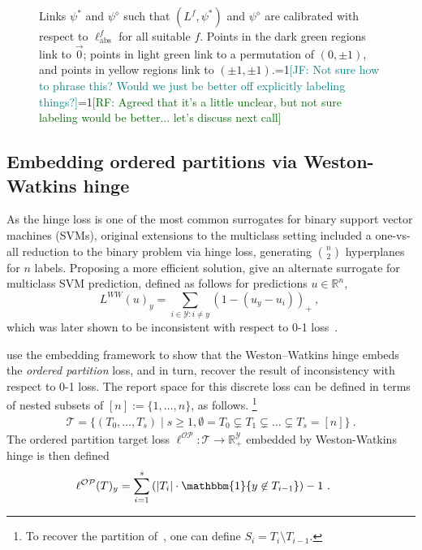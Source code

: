 \documentclass[11pt]{article}
\newcommand{\Comments}{1}
\newcommand{\mynote}[2]{\ifnum\Comments=1\textcolor{#1}{#2}\fi}
\newcommand{\raf}[1]{\mynote{darkgreen}{[RF: #1]}}
\newcommand{\jessie}[1]{\mynote{teal}{[JF: #1]}}
\newcommand{\reals}{\mathbb{R}}
\newcommand{\OP}{\mathcal{OP}}
\newcommand{\T}{\mathcal{T}}
\newcommand{\Y}{\mathcal{Y}}
\newcommand{\ones}{\mathbbm{1}}
\newcommand{\Ind}[1]{\ones\{#1\}}
\newcommand{\ellabs}{\ell_{\text{abs}}^f}
\begin{document}
\begin{figure}
\begin{center}
\begin{minipage}{0.48\linewidth}
		\end{minipage}\hfill
		\caption{Links $\psi^*$ and $\psi^\diamond$ such that $(L^f, \psi^*)$ and $\psi^\diamond$ are calibrated with respect to $\ellabs$ for all suitable $f$. Points in the dark green regions link to $\vec 0$; points in light green link to a permutation of $(0,\pm 1)$, and points in yellow regions link to $(\pm 1, \pm 1)$.\jessie{Not sure how to phrase this?  Would we just be better off explicitly labeling things?}\raf{Agreed that it's a little unclear, but not sure labeling would be better... let's discuss next call}}
		\label{fig:lovasz-links}
	\end{center}
\end{figure}

\subsection{Embedding ordered partitions via Weston-Watkins hinge}
\label{sec:winge}
As the hinge loss is one of the most common surrogates for binary support vector machines (SVMs), original extensions to the multiclass setting included a one-vs-all reduction to the binary problem via hinge loss, generating ${n \choose 2}$ hyperplanes for $n$ labels.
Proposing a more efficient solution, \citet{weston1999support} give an alternate surrogate for multiclass SVM prediction, defined as follows for predictions $u \in \reals^n$,
\begin{equation}\label{eq:ww-hinge}
L^{WW}(u)_y = \sum_{i \in \Y : i \neq y} (1 - (u_y - u_i))_+~,~
\end{equation}
which was later shown to be inconsistent with respect to 0-1 loss~\citep{tewari2007consistency,liu2007fisher}.

\citet{wang2020weston} use the embedding framework to show that the Weston--Watkins hinge embeds the \emph{ordered partition} loss, and in turn, recover the result of inconsistency with respect to 0-1 loss.
The report space for this discrete loss can be defined in terms of nested subsets of $[n] := \{1, \ldots, n\}$, as follows.%
\footnote{To recover the partition of~\citet{wang2020weston}, one can define $S_i = T_i \setminus T_{i-1}$.}
\begin{align*}
\T = \{ (T_0,\ldots,T_s) \mid s \geq 1, \emptyset = T_0 \subsetneq T_1 \subsetneq \ldots \subsetneq T_s = [n]\}~.
\end{align*}
\noindent
The ordered partition target loss $\ell^{\OP} : \T \to \reals^\Y_+$ embedded by Weston-Watkins hinge is then defined
\begin{align*}
\ell^\OP(T)_y &= \sum_{i=1}^{s} \left(|T_{i}| \cdot \Ind{y \not \in T_{i-1}} \right) -1~.~
\end{align*}
\end{document}
